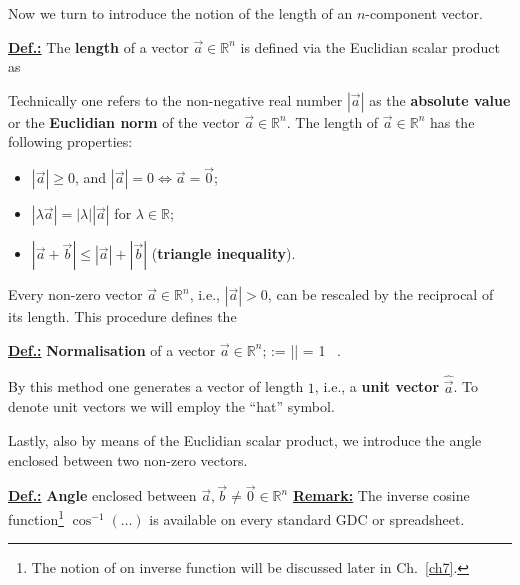 \medskip
\noindent
Now we turn to introduce the notion of the length of an 
$n$-component vector.

\medskip
\noindent
\underline{\bf Def.:} The {\bf length} of a vector $\vec{a} \in 
\mathbb{R}^{n}$ is defined via the Euclidian scalar product as
%
\be
{}
\ee
%

\medskip
\noindent
Technically one refers to the non-negative real number $|\vec{a}|$ 
as the {\bf absolute value} or the {\bf Euclidian norm} of the 
vector $\vec{a}\in \mathbb{R}^{n}$. The length of $\vec{a} \in
\mathbb{R}^{n}$ has the following properties: 
%
\begin{itemize}
	\item $|\vec{a}| \geq 0$, and $|\vec{a}|=0 \Leftrightarrow
	\vec{a}=\vec{0}$;
	\item $|\lambda\vec{a}| = |\lambda||\vec{a}|$ for $\lambda \in
	{\mathbb R}$;
	\item $|\vec{a}+\vec{b}| \leq |\vec{a}|+|\vec{b}|$
	\hfill ({\bf triangle inequality}).
\end{itemize}

\medskip
\noindent
Every non-zero vector $\vec{a} \in \mathbb{R}^{n}$, i.e., 
$|\vec{a}|>0$, can be rescaled by the reciprocal of its length. 
This procedure defines the

\medskip
\noindent
\underline{\bf Def.:}
{\bf Normalisation} of a vector $\vec{a} \in
\mathbb{R}^{n}$;
%
\be
{} := 
\qquad\Rightarrow\qquad
|| = 1 \ .
\ee
%

\medskip
\noindent
By this method one generates a vector of length $1$, i.e., a {\bf 
unit vector} $\hat{\vec{a}}$. To denote unit vectors we will 
employ the ``hat'' symbol.

\medskip
\noindent
Lastly, also by means of the Euclidian scalar product, we introduce the angle enclosed between two non-zero vectors.

\medskip
\noindent
\underline{\bf Def.:}
{\bf Angle} enclosed between $\vec{a},\vec{b} \neq \vec{0}
\in {\mathbb R}^{n}$ 
%
\be
{}
\ee
%
\underline{\bf Remark:} The inverse cosine function\footnote{The 
notion of on inverse function will be discussed later in 
Ch.~\ref{ch7}.} $\cos^{-1}(\ldots)$ is available on every standard 
GDC or spreadsheet.

